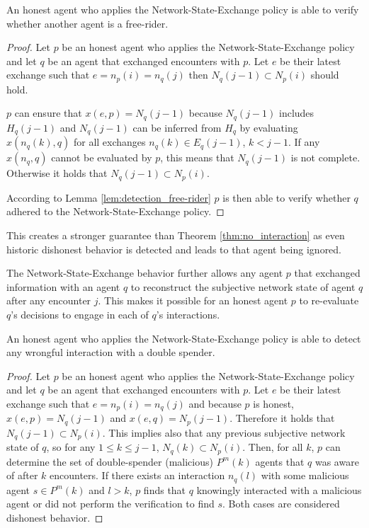 \begin{thm}
    \label{thm:detectability_free-rider}
    An honest agent who applies the Network-State-Exchange policy is able to verify whether another
    agent is a free-rider.
\end{thm}
\begin{proof}
    Let $p$ be an honest agent who applies the Network-State-Exchange policy and let $q$ be an agent
    that exchanged encounters with $p$. Let $e$ be their latest exchange such that $e = n_p(i) = n_q(j)$
    then $N_q(j-1) \subset N_p(i)$ should hold.
    
    $p$ can ensure that $x(e, p) = N_q(j-1)$ because $N_q(j-1)$ includes $H_q(j-1)$ and $N_q(j-1)$
    can be inferred from $H_q$ by evaluating $x(n_q(k), q)$ for all exchanges $n_q(k) \in E_q(j-1)$, $k<j-1$.
    If any $x(n_q, q)$ cannot be evaluated by $p$, this means that $N_q(j-1)$ is not complete.
    Otherwise it holds that $N_q(j-1) \subset N_p(i)$. 

    According to Lemma \ref{lem:detection_free-rider} $p$ is then able to verify whether 
    $q$ adhered to the Network-State-Exchange policy.
\end{proof}

This creates a stronger guarantee than Theorem \ref{thm:no_interaction} as even historic dishonest
behavior is detected and leads to that agent being ignored.

The Network-State-Exchange behavior further allows any agent $p$ that exchanged information with an agent $q$
to reconstruct the subjective network state of agent $q$ after any encounter $j$. 
This makes it possible for an honest agent $p$ to re-evaluate $q$'s decisions to engage in each of $q$'s 
interactions.

\begin{thm}
    \label{thm:ver_free-rider}
    An honest agent who applies the Network-State-Exchange policy is able to detect any wrongful
    interaction with a double spender.
\end{thm}
\begin{proof}
    Let $p$ be an honest agent who applies the Network-State-Exchange policy and let $q$ be an agent
    that exchanged encounters with $p$. Let $e$ be their latest exchange such that $e = n_p(i) = n_q(j)$
    and because $p$ is honest, $x(e, p) = N_q(j-1)$ and $x(e,q) = N_p(j-1)$. 
    Therefore it holds that $N_q(j-1) \subset N_p(i)$. This implies also that any previous 
    subjective network state of $q$, so for any $1 \leq k \leq j-1$, $N_q(k) \subset N_p(i)$. Then,
    for all $k$, $p$ can determine the set of double-spender (malicious) $P^m(k)$ agents that $q$
    was aware of after $k$ encounters. If there exists an interaction $n_q(l)$ with some malicious
    agent $s \in P^m(k)$ and $l>k$, $p$ finds that $q$ knowingly interacted with a malicious agent or did not
    perform the verification to find $s$. Both cases are considered dishonest behavior.
\end{proof}

